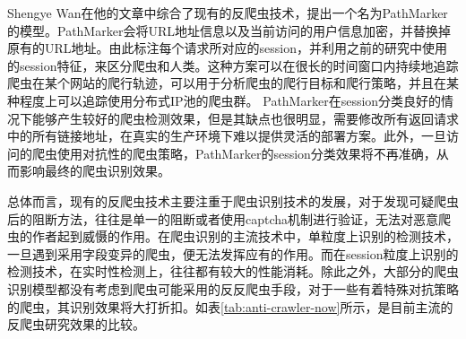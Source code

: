 \documentclass[doctor,privacy,twoside]{buaa_mac}
\begin{document}
  Shengye Wan在他的文章中综合了现有的反爬虫技术，提出一个名为PathMarker的模型。PathMarker会将URL地址信息以及当前访问的用户信息加密，并替换掉原有的URL地址。由此标注每个请求所对应的session，并利用之前的研究中使用的session特征，来区分爬虫和人类。这种方案可以在很长的时间窗口内持续地追踪爬虫在某个网站的爬行轨迹，可以用于分析爬虫的爬行目标和爬行策略，并且在某种程度上可以追踪使用分布式IP池的爬虫群。 PathMarker在session分类良好的情况下能够产生较好的爬虫检测效果，但是其缺点也很明显，需要修改所有返回请求中的所有链接地址，在真实的生产环境下难以提供灵活的部署方案。此外，一旦访问的爬虫使用对抗性的爬虫策略，PathMarker的session分类效果将不再准确，从而影响最终的爬虫识别效果。

  总体而言，现有的反爬虫技术主要注重于爬虫识别技术的发展，对于发现可疑爬虫后的阻断方法，往往是单一的阻断或者使用captcha机制进行验证，无法对恶意爬虫的作者起到威慑的作用。在爬虫识别的主流技术中，单粒度上识别的检测技术，一旦遇到采用字段变异的爬虫，便无法发挥应有的作用。而在session粒度上识别的检测技术，在实时性检测上，往往都有较大的性能消耗。除此之外，大部分的爬虫识别模型都没有考虑到爬虫可能采用的反反爬虫手段，对于一些有着特殊对抗策略的爬虫，其识别效果将大打折扣。如表\ref{tab:anti-crawler-now}所示，是目前主流的反爬虫研究效果的比较。







\end{document}
